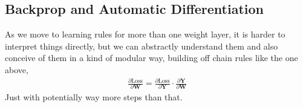 \subsection{Backprop and Automatic Differentiation}

As we move to learning rules for more than one weight layer, it is harder to interpret things directly, but we can abstractly understand them and also conceive of them in a kind of modular way, building off chain rules like the one above, 
\begin{eqnarray}
\frac{\partial \text{Loss}}{\partial \mathbf{W}} = \frac{\partial \text{Loss}}{\partial \mathbf{Y}} \cdot \frac{\partial \mathbf{Y}}{\partial \mathbf{W}}
\end{eqnarray}
Just with potentially way more steps than that.
